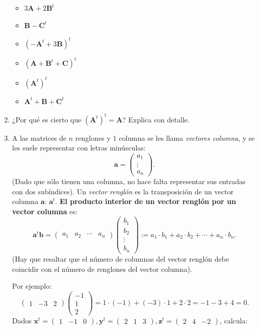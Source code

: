 \documentclass[8pt,a4paper]{article}
\begin{document}
\begin{enumerate}
	\begin{multicols}{2}
		\begin{itemize}
			\item $\displaystyle 3\mathbf{A}+2\mathbf{B}^t$
			\item $\displaystyle \mathbf{B}-\mathbf{C}^t$
			\item $\displaystyle \left(-\mathbf{A}^t+3\mathbf{B}\right)^t$
			\item $\displaystyle \left(\mathbf{A}+\mathbf{B}^t+\mathbf{C}\right)^t$
			\item $\displaystyle \left(\mathbf{A}^t\right)^t$
			\item $\displaystyle \mathbf{A}^t+\mathbf{B}+\mathbf{C}^t$
		\end{itemize}
	\end{multicols}
	
		\item ¿Por qué es cierto que $\left(\mathbf{A}^t\right)^t=\mathbf{A}$? Explica con detalle.
	
		\item A las matrices de $n$ renglones y $1$ columna se les llama \textit{vectores columna}, y se les suele representar con letras minúsculas:
%		
		\[\mathbf{a}=\begin{pmatrix} a_1 \\ \vdots \\ a_n \end{pmatrix}.\]
%
(Dado que sólo tienen una columna, no hace falta representar sus entradas con dos subíndices). Un \textit{vector renglón} es la transposición de un vector columna $\mathbf{a}$: $\mathbf{a}^t$. \textbf{El producto interior de un vector renglón por un vector columna} es:
%
		\[\mathbf{a}^t\mathbf{b}=\begin{pmatrix} a_1 & a_2 & \cdots & a_n \end{pmatrix} \begin{pmatrix} b_1 \\ b_2 \\ \vdots \\ b_n \end{pmatrix}:=a_1\cdot b_1+a_2\cdot b_2+\cdots+a_n\cdot b_n.\]
%
(Hay que resaltar que el número de columnas del vector renglón debe coincidir con el número de renglones del vector columna).

Por ejemplo:
%
		\[\begin{pmatrix} 1 & -3 & 2 \end{pmatrix}\begin{pmatrix} -1 \\ 1 \\ 2 \end{pmatrix}=1\cdot(-1)+(-3)\cdot 1+2\cdot 2=-1-3+4=0.\]
%
Dados $\displaystyle \mathbf{x}^t=\begin{pmatrix}1 & -1 & 0\end{pmatrix}, \mathbf{y}^t=\begin{pmatrix}2 & 1 & 3\end{pmatrix}, \mathbf{z}^t=\begin{pmatrix}2&4&-2\end{pmatrix}$, calcula:


\end{enumerate}
\end{document}
